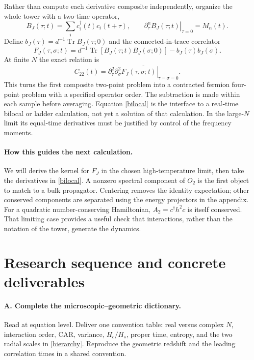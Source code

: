\documentclass[11pt,a4paper]{article}
\newcommand{\Tr}{\operatorname{Tr}}
\begin{document}
Rather than compute each derivative composite independently, organize
the whole tower with a two-time operator,
\begin{equation}
 B_J(\tau;t)=\sum_i c_i^\dagger(t)c_i(t+\tau),\qquad
 \left.\partial_\tau^nB_J(\tau;t)\right|_{\tau=0}=M_n(t).
\end{equation}
Define $b_J(\tau)=d^{-1}\Tr B_J(\tau;0)$ and the connected-in-trace
correlator
\begin{equation}
 F_J(\tau,\sigma;t)=d^{-1}\Tr\!\left[B_J(\tau;t)B_J(\sigma;0)\right]
                  -b_J(\tau)b_J(\sigma).
\end{equation}
At finite $N$ the exact relation is
\begin{equation}
 C_{22}(t)=
 \overline{\left.
 \partial_\tau^2\partial_\sigma^2F_J(\tau,\sigma;t)
 \right|_{\tau=\sigma=0}}.\label{bilocal}
\end{equation}
This turns the first composite two-point problem into a contracted
fermion four-point problem with a specified operator order. The
subtraction is made within each sample before averaging. Equation
\eqref{bilocal} is the interface to a real-time bilocal or ladder
calculation, not yet a solution of that calculation. In the large-$N$
limit its equal-time derivatives must be justified by control of the
frequency moments.

\paragraph{How this guides the next calculation.}
We will derive the kernel for $F_J$ in the chosen high-temperature
limit, then take the derivatives in \eqref{bilocal}. A nonzero spectral
component of $O_2$ is the first object to match to a bulk propagator.
Centering removes the identity expectation; other conserved components
are separated using the energy projectors in the appendix. For a
quadratic number-conserving Hamiltonian, $A_2=c^\dagger h^2c$ is itself
conserved. That limiting case provides a useful check that interactions,
rather than the notation of the tower, generate the dynamics.

\newpage
\section{Research sequence and concrete deliverables}
\paragraph{A. Complete the microscopic--geometric dictionary.}
Read \cite{scales,rahman,confine,mss25,correction} at equation level.
Deliver one convention table: real versus complex $N$, interaction
order, CAR, variance, $H_c/H_s$, proper time, entropy, and the two radial
scales in \eqref{hierarchy}. Reproduce the geometric redshift and the
leading correlation times in a shared convention.
\end{document}

